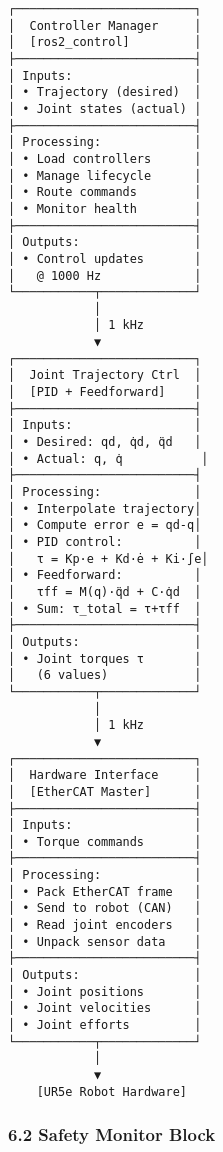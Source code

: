 \documentclass[
]{article}
\begin{document}
\begin{verbatim}
┌─────────────────────────┐
│  Controller Manager     │
│  [ros2_control]         │
├─────────────────────────┤
│ Inputs:                 │
│ • Trajectory (desired)  │
│ • Joint states (actual) │
├─────────────────────────┤
│ Processing:             │
│ • Load controllers      │
│ • Manage lifecycle      │
│ • Route commands        │
│ • Monitor health        │
├─────────────────────────┤
│ Outputs:                │
│ • Control updates       │
│   @ 1000 Hz             │
└───────────┬─────────────┘
            │
            │ 1 kHz
            ▼
┌─────────────────────────┐
│  Joint Trajectory Ctrl  │
│  [PID + Feedforward]    │
├─────────────────────────┤
│ Inputs:                 │
│ • Desired: qd, q̇d, q̈d   │
│ • Actual: q, q̇           │
├─────────────────────────┤
│ Processing:             │
│ • Interpolate trajectory│
│ • Compute error e = qd-q│
│ • PID control:          │
│   τ = Kp·e + Kd·ė + Ki·∫e│
│ • Feedforward:          │
│   τff = M(q)·q̈d + C·q̇d  │
│ • Sum: τ_total = τ+τff  │
├─────────────────────────┤
│ Outputs:                │
│ • Joint torques τ       │
│   (6 values)            │
└───────────┬─────────────┘
            │
            │ 1 kHz
            ▼
┌─────────────────────────┐
│  Hardware Interface     │
│  [EtherCAT Master]      │
├─────────────────────────┤
│ Inputs:                 │
│ • Torque commands       │
├─────────────────────────┤
│ Processing:             │
│ • Pack EtherCAT frame   │
│ • Send to robot (CAN)   │
│ • Read joint encoders   │
│ • Unpack sensor data    │
├─────────────────────────┤
│ Outputs:                │
│ • Joint positions       │
│ • Joint velocities      │
│ • Joint efforts         │
└───────────┬─────────────┘
            │
            ▼
    [UR5e Robot Hardware]
\end{verbatim}

\hypertarget{safety-monitor-block}{%
\subsubsection{6.2 Safety Monitor Block}\label{safety-monitor-block}}
\end{document}
